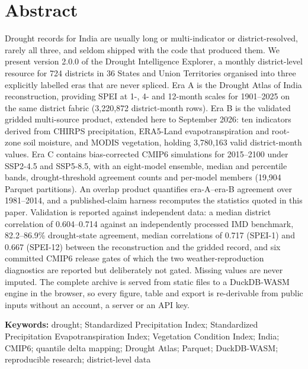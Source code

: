 \documentclass[10pt,a4paper]{article}
\begin{document}
\section*{Abstract}
Drought records for India are usually long or multi-indicator or district-resolved, rarely all three, and seldom shipped with the code that produced them. We present version 2.0.0 of the Drought Intelligence Explorer, a monthly district-level resource for 724 districts in 36 States and Union Territories organised into three explicitly labelled eras that are never spliced. Era A is the Drought Atlas of India reconstruction, providing SPEI at 1-, 4- and 12-month scales for 1901--2025 on the same district fabric (3,220,872 district-month rows). Era B is the validated gridded multi-source product, extended here to September 2026: ten indicators derived from CHIRPS precipitation, ERA5-Land evapotranspiration and root-zone soil moisture, and MODIS vegetation, holding 3,780,163 valid district-month values. Era C contains bias-corrected CMIP6 simulations for 2015--2100 under SSP2-4.5 and SSP5-8.5, with an eight-model ensemble, median and percentile bands, drought-threshold agreement counts and per-model members (19,904 Parquet partitions). An overlap product quantifies era-A--era-B agreement over 1981--2014, and a published-claim harness recomputes the statistics quoted in this paper. Validation is reported against independent data: a median district correlation of 0.604--0.714 against an independently processed IMD benchmark, 82.2--86.9\% drought-state agreement, median correlations of 0.717 (SPEI-1) and 0.667 (SPEI-12) between the reconstruction and the gridded record, and six committed CMIP6 release gates of which the two weather-reproduction diagnostics are reported but deliberately not gated. Missing values are never imputed. The complete archive is served from static files to a DuckDB-WASM engine in the browser, so every figure, table and export is re-derivable from public inputs without an account, a server or an API key.

\vspace{6pt}
{\small\textbf{Keywords:} drought; Standardized Precipitation Index; Standardized Precipitation Evapotranspiration Index; Vegetation Condition Index; India; CMIP6; quantile delta mapping; Drought Atlas; Parquet; DuckDB-WASM; reproducible research; district-level data\par}

\end{document}
